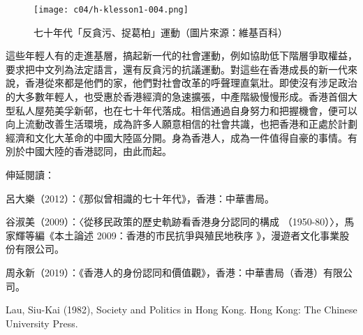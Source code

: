 \begin{figure}[htbp]
    \centering
    \texttt{[image: c04/h-klesson1-004.png]}
    \caption{七十年代「反貪污、捉葛柏」運動（圖片來源：維基百科）} 
\end{figure}

這些年輕人有的走進基層，搞起新一代的社會運動，例如協助低下階層爭取權益，要求把中文列為法定語言，還有反貪污的抗議運動。對這些在香港成長的新一代來說，香港從來都是他們的家，他們對社會改革的呼聲理直氣壯。即使沒有涉足政治的大多數年輕人，也受惠於香港經濟的急速擴張，中產階級慢慢形成。香港首個大型私人屋苑美孚新邨，也在七十年代落成。相信通過自身努力和把握機會，便可以向上流動改善生活環境，成為許多人願意相信的社會共識，也把香港和正處於計劃經濟和文化大革命的中國大陸區分開。身為香港人，成為一件值得自豪的事情。有別於中國大陸的香港認同，由此而起。

伸延閱讀：

呂大樂（2012）：《那似曾相識的七十年代》，香港：中華書局。

谷淑美（2009）：〈從移民政策的歷史軌跡看香港身分認同的構成 （1950-80）〉，馬家輝等編《本土論述 2009：香港的市民抗爭與殖民地秩序 》，漫遊者文化事業股份有限公司。

周永新（2019）：《香港人的身份認同和價值觀》，香港：中華書局（香港）有限公司。

Lau, Siu-Kai (1982), Society and Politics in Hong Kong. Hong Kong: The Chinese University Press.